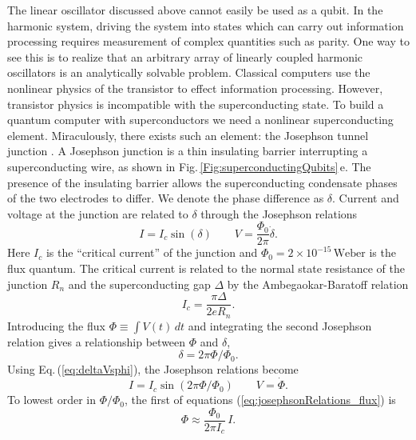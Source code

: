 The linear oscillator discussed above cannot easily be used as a qubit.
In the harmonic system, driving the system into states which can carry out information processing requires measurement of complex quantities such as parity.
One way to see this is to realize that an arbitrary array of linearly coupled harmonic oscillators is an analytically solvable problem.
Classical computers use the nonlinear physics of the transistor to effect information processing.
However, transistor physics is incompatible with the superconducting state.
To build a quantum computer with superconductors we need a nonlinear superconducting element.
Miraculously, there exists such an element: the Josephson tunnel junction \cite{Josephson:junction1962}.
A Josephson junction is a thin insulating barrier interrupting a superconducting wire, as shown in Fig.\,\ref{Fig:superconductingQubits}\,e.
The presence of the insulating barrier allows the superconducting condensate phases of the two electrodes to differ.
We denote the phase difference as $\delta$.
Current and voltage at the junction are related to $\delta$ through the Josephson relations \cite{Josephson:junction1962} \begin{equation}
I = I_c \sin(\delta) \qquad V = \frac{\Phi_0}{2\pi}\dot{\delta} \label{eq:josephsonRelations} . \end{equation}
Here $I_c$ is the ``critical current'' of the junction and $\Phi_0 = 2\times 10^{-15}\,\textrm{Weber}$ is the flux quantum.
The critical current is related to the normal state resistance of the junction $R_n$ and the superconducting gap $\Delta$ by the Ambegaokar-Baratoff relation \begin{equation}
I_c = \frac{\pi \Delta}{2 e R_n}. \end{equation}
Introducing the flux $\Phi \equiv \int V(t)\,dt$ and integrating the second Josephson relation gives a relationship between $\Phi$ and $\delta$, \begin{equation}
\delta = 2 \pi \Phi / \Phi_0 . \label{eq:deltaVsphi} \end{equation}
Using Eq.\,(\ref{eq:deltaVsphi}), the Josephson relations become \begin{equation}
I = I_c \sin \left( 2\pi \Phi / \Phi_0 \right) \qquad V = \dot{\Phi} . \label{eq:josephsonRelations_flux} \end{equation}
To lowest order in $\Phi/\Phi_0$, the first of equations (\ref{eq:josephsonRelations_flux}) is \begin{equation}
\Phi \approx \frac{\Phi_0}{2\pi I_c} \, I . \label{eq:ch:introduction:PhiVsIApprox} \end{equation}
